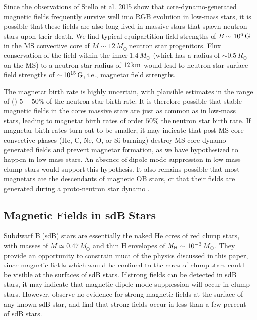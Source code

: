 Since the observations of Stello et al. 2015 show that core-dynamo-generated magnetic fields frequently survive well into RGB evolution in low-mass stars, it is possible that these fields are also long-lived in massive stars that spawn neutron stars upon their death. We find typical equipartition field strengths of $B \sim 10^6 \, {\rm G}$ in the MS convective core of $M \sim 12 \, M_\odot$ neutron star progenitors. Flux conservation of the field within the inner $1.4 \, M_\odot$ (which has a radius of $\sim \! 0.5 \, R_\odot$ on the MS) to a neutron star radius of $12 \, {\rm km}$ would lead to neutron star surface field strengths of $\sim \! 10^{15} \, {\rm G}$, i.e., magnetar field strengths.  

The magnetar birth rate is highly uncertain, with plausible estimates in the range of (\cite{keane_1998,mereghetti_2015}) $5-50\%$ of the neutron star birth rate. It is therefore possible that stable magnetic fields in the cores massive stars are just as common as in low-mass stars, leading to magnetar birth rates of order $50 \%$ the neutron star birth rate.  
If magnetar birth rates turn out to be smaller, it may indicate that post-MS core convective phases (He, C, Ne, O, or Si burning) destroy MS core-dynamo-generated fields and prevent magnetar formation, as we have hypothesized to happen in low-mass stars. 
An absence of dipole mode suppression in low-mass clump stars would support this hypothesis. It also remains possible that most magnetars are the descendants of magnetic OB stars, or that their fields are generated during a proto-neutron star dynamo \cite{1992ApJ...392L...9D}.



\subsection{Magnetic Fields in sdB Stars}

Subdwarf B (sdB) stars are essentially the naked He cores of red clump stars, with masses of $M \simeq 0.47 \, M_\odot$ \citep{fontaine_2012} and thin H envelopes of $M_{\rm H} \sim 10^{-3} \, M_\odot$. They provide an opportunity to constrain much of the physics discussed in this paper, since magnetic fields which would be confined to the cores of clump stars could be visible at the surfaces of sdB stars. If strong fields can be detected in sdB stars, it may indicate that magnetic dipole mode suppression will occur in clump stars. However, \cite{Landstreet_2012} observe no evidence for strong magnetic fields at the surface of any known sdB star, and find that strong fields occur in less than a few percent of sdB stars. 

